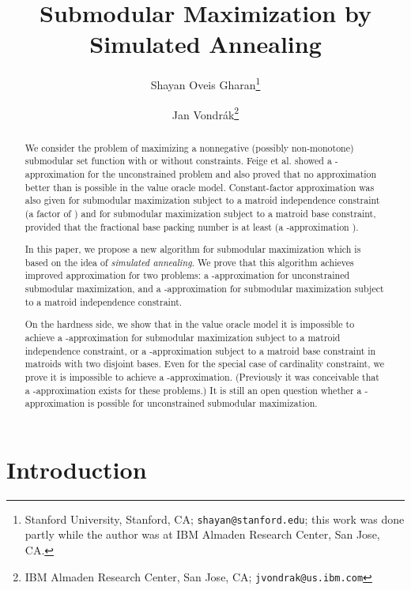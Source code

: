 \documentclass{article}[11pt]
\begin{document}
\title{Submodular Maximization by Simulated Annealing}

\author{
Shayan Oveis Gharan\thanks{Stanford University, Stanford, CA; {\tt shayan@stanford.edu};
this work was done partly while the author was at IBM Almaden Research Center, San Jose, CA.}
\and Jan Vondr\'ak\thanks{IBM Almaden Research Center, San Jose, CA; {\tt jvondrak@us.ibm.com}}
}

\maketitle

\begin{abstract}
We consider the problem of maximizing a nonnegative (possibly non-monotone)
submodular set function with or without constraints. Feige et al. \cite{FMV07}
showed a -approximation for the unconstrained problem and also proved that
no approximation better than  is possible in the value oracle model.
Constant-factor approximation was also given for submodular maximization subject
to a matroid independence constraint  (a factor of  \cite{Vondrak09})
and for submodular maximization subject to a matroid base constraint,
provided that the fractional base packing number is at least 
(a -approximation \cite{Vondrak09}).

In this paper, we propose a new algorithm for submodular maximization which is based
on the idea of {\em simulated annealing}. We prove that this algorithm achieves
improved approximation for two problems:
a -approximation for unconstrained submodular maximization,
and a -approximation for submodular maximization subject to a matroid
independence constraint.

On the hardness side, we show that in the value oracle model it is impossible
to achieve a -approximation for submodular maximization
subject to a matroid independence constraint, or a -approximation
subject to a matroid base constraint in matroids with two disjoint bases.
Even for the special case of cardinality constraint, we prove it is impossible to
achieve a -approximation.
(Previously it was conceivable that a -approximation exists for these problems.)
It is still an open question whether a -approximation is possible
for unconstrained submodular maximization.
\end{abstract}


\thispagestyle{empty}
\newpage
\setcounter{page}{1}


\section{Introduction}
\end{document}
